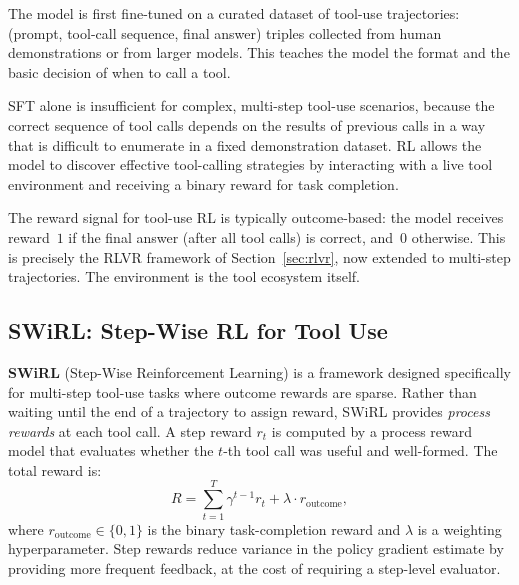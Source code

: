 \begin{description}[leftmargin=!,labelwidth=3.5cm]
\item[SFT on demonstrations] The model is first fine-tuned on a
  curated dataset of tool-use trajectories: (prompt, tool-call
  sequence, final answer) triples collected from human demonstrations
  or from larger models. This teaches the model the format and the
  basic decision of when to call a tool.

\item[RL for multi-step tool use] SFT alone is insufficient for
  complex, multi-step tool-use scenarios, because the correct sequence
  of tool calls depends on the results of previous calls in a way that
  is difficult to enumerate in a fixed demonstration dataset. RL allows
  the model to discover effective tool-calling strategies by
  interacting with a live tool environment and receiving a binary
  reward for task completion.
\end{description}

The reward signal for tool-use RL is typically outcome-based: the
model receives reward~$1$ if the final answer (after all tool calls)
is correct, and~$0$ otherwise. This is precisely the RLVR framework
of Section~\ref{sec:rlvr}, now extended to multi-step trajectories.
The environment is the tool ecosystem itself.

\subsection{SWiRL: Step-Wise RL for Tool Use}
\label{subsec:swirl}

\textbf{SWiRL} (Step-Wise Reinforcement Learning) is a framework
designed specifically for multi-step tool-use tasks where outcome
rewards are sparse. Rather than waiting until the end of a trajectory
to assign reward, SWiRL provides \emph{process rewards} at each tool
call. A step reward $r_t$ is computed by a process reward model that
evaluates whether the $t$-th tool call was useful and well-formed.
The total reward is:
\begin{equation}
\label{eq:swirl-reward}
R = \sum_{t=1}^{T} \gamma^{t-1} r_t + \lambda \cdot r_{\mathrm{outcome}},
\end{equation}
where $r_{\mathrm{outcome}} \in \{0, 1\}$ is the binary task-completion
reward and $\lambda$ is a weighting hyperparameter. Step rewards
reduce variance in the policy gradient estimate by providing more
frequent feedback, at the cost of requiring a step-level evaluator.

